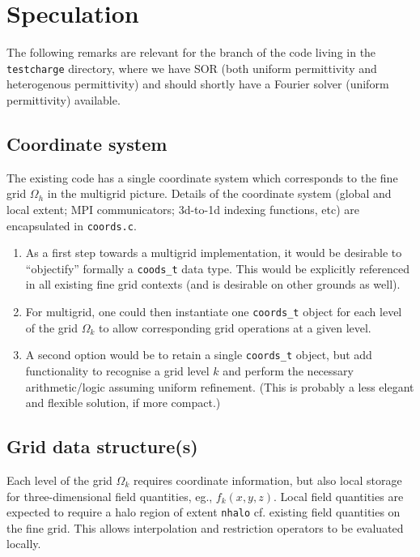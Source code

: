 \documentclass[11pt, oneside, a4paper]{article}
\begin{document}
\section{Speculation}

The following remarks are relevant for the branch of the code living
in the \texttt{testcharge} directory, where we have SOR (both uniform
permittivity and heterogenous permittivity) and should shortly have a
Fourier solver (uniform permittivity) available.

\subsection{Coordinate system}

The existing code has a single coordinate system which corresponds
to the fine grid $\Omega_h$ in the multigrid picture. Details of the
coordinate system (global and local extent; MPI communicators; 3d-to-1d
indexing functions, etc) are encapsulated in \texttt{coords.c}.
\begin{enumerate}
\item
As a first step towards a multigrid implementation, it would be
desirable to ``objectify'' formally a \texttt{coods\_t} data type.
This would be explicitly referenced in all existing fine grid
contexts (and is desirable on other grounds as well).
\item
For multigrid, one could then instantiate one \texttt{coords\_t}
object for each level of the grid $\Omega_k$ to allow corresponding
grid operations at a given level.
\item
A second option would be to retain a single \texttt{coords\_t} object,
but add functionality to recognise a grid level $k$ and perform the
necessary arithmetic/logic assuming uniform refinement. (This is
probably a less elegant and flexible solution, if more compact.)
\end{enumerate}

\subsection{Grid data structure(s)}

Each level of the grid $\Omega_k$ requires coordinate information,
but also local storage for three-dimensional field quantities, eg.,
$f_k(x,y,z)$. Local field quantities are expected to require a halo
region of extent \texttt{nhalo} cf. existing field quantities on the
fine grid. This allows interpolation and restriction operators to be
evaluated locally.
\end{document}
